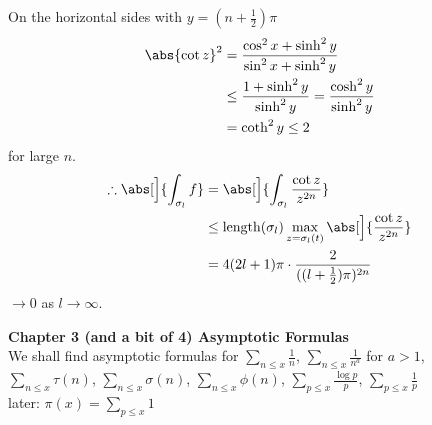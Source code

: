 \begin{center}
\end{center}
On the horizontal sides with $y=(n+\frac12)\pi$
\begin{align*}
\abs{\cot z}^2 &= \frac{\cos^2 x+\sinh^2 y}{\sin^2 x+\sinh^2 y} \\
&\leq \frac{1+\sinh^2 y}{\sinh^2 y} = \frac{\cosh^2 y}{\sinh^2 y} \\
&= \coth^2 y \leq 2
\end{align*}
for large $n$.
\begin{align*}
\therefore \abs[\Big]{\int_{\sigma_l}f} &= \abs[\Big]{\int_{\sigma_l}\frac{\cot z}{z^{2n}}} \\
&\leq \operatorname{length}(\sigma_l)\max_{z=\sigma_l(t)}\abs[\Big]{\frac{\cot z}{z^{2n}}} \\
&= 4(2l+1)\pi\cdot\frac{2}{((l+\frac12)\pi)^{2n}}
\end{align*}
$\to0$ as $l\to\infty$.

\textbf{Chapter 3 (and a bit of 4) Asymptotic Formulas} \\
We shall find asymptotic formulas for $\sum_{n\leq x}\frac{1}{n}$, $\sum_{n\leq x}\frac{1}{n^a}$ for $a>1$, $\sum_{n\leq x}\tau(n)$, $\sum_{n\leq x}\sigma(n)$, $\sum_{n\leq x}\phi(n)$, $\sum_{p\leq x}\frac{\log p}{p}$, $\sum_{p\leq x}\frac{1}{p}$ \\
later: $\pi(x)=\sum_{p\leq x}1$


